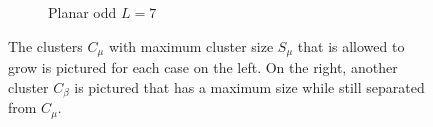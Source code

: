 \begin{figure}
\begin{subfigure}{0.45\linewidth}
  \end{subfigure}
  \begin{subfigure}{0.45\linewidth}
    \centering
    \caption{Planar odd $L=7$}
  \end{subfigure}
  \caption{The clusters $C_\mu$ with maximum cluster size $S_\mu$ that is allowed to grow is pictured for each case on the left. On the right, another cluster $C_\beta$ is pictured that has a maximum size while still separated from $C_\mu$.}\label{fig:bucket_cmsizes}
\end{figure}